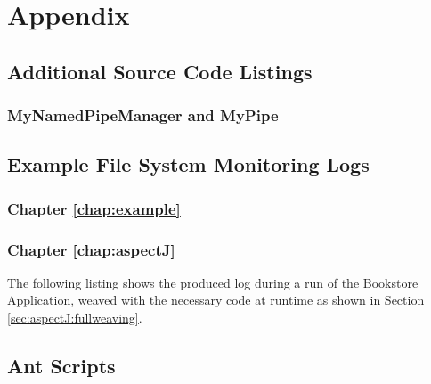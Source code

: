 % 


\appendix
\chapter{Appendix}

  \section{Additional Source Code Listings}
    \subsection{MyNamedPipeManager and MyPipe}
      \setJavaCodeListing
      

      \setJavaCodeListing
      

\newpage
  \section{Example File System Monitoring Logs}

	\subsection{Chapter \ref{chap:example}}
		
		
	
	\subsection{Chapter \ref{chap:aspectJ}}
	    The following listing shows the produced log during a run of the Bookstore Application, weaved with the necessary code at runtime as shown in Section \ref{sec:aspectJ:fullweaving}.
		
	
\newpage
  \section{Ant Scripts}
